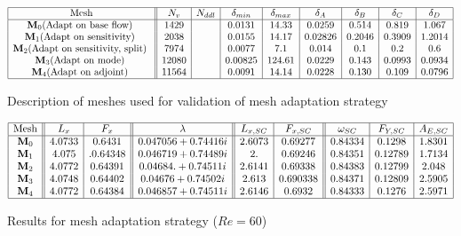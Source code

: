 \documentclass[twocolumn,10pt]{asme2ej}
\begin{document}

\begin{table*}
$$
\begin{array}{|c||c|c|c|c|c|c|c|c|c|}
\hline
\mbox{Mesh} & N_v & N_{ddl} & \delta_{min} & \delta_{max} & \delta_A  & \delta_B  & \delta_C  & \delta_D  \\
\hline
\mathbf{M}_0 \mbox{(Adapt on base flow) } & 1429 & 		& 0.0131 & 14.33 		& 0.0259 	& 0.514 	& 0.819 	& 1.067 \\   
\mathbf{M}_1 \mbox{(Adapt on sensitivity) } & 2038 & 		& 0.0155 & 14.17 		& 0.02826 & 0.2046 	& 0.3909 	& 1.2014 	\\
\mathbf{M}_2 \mbox{(Adapt on sensitivity, split) } & 7974 &		& 0.0077 & 7.1  		& 0.014 	& 0.1 	&   0.2 	& 0.6   \\
\mathbf{M}_3 \mbox{(Adapt on mode) } 	& 12080  &			&0.00825	& 124.61		& 0.0229	& 0.143	& 0.0993	& 0.0934 \\
\mathbf{M}_4 \mbox{(Adapt on adjoint) } 	& 11564 	&		& 0.0091	& 14.14		& 0.0228	& 0.130	& 0.109	& 0.0796  \\
\hline
\end{array}
$$
\caption{Description of meshes used for validation of mesh adaptation strategy}
\end{table*}


\begin{table*}
$$
\begin{array}{|c||c|c||c||c|c||c|c|c|}
\hline
\mbox{Mesh} & L_x & F_x & \lambda & L_{x,SC} & F_{x,SC} & \omega_{SC}  & F_{Y,SC} & A_{E,SC} \\
\hline
\mathbf{M}_0 & 4.0733 & 0.6431 	& 0.047056 + 0.74416i 		& 2.6073  &0.69277 		&  0.84334 & 0.1298 & 1.8301  \\
\mathbf{M}_1 & 4.075 &.  0.64348  	& 0.046719 + 0.74489i 		& 2.          & 0.69246 	& 0.84351 & 0.12789 & 1.7134 \\  
\mathbf{M}_2 & 4.0772 & 0.64391 	& 0.04684. +  0.74511i 		& 2.6141  & 0.69338 	& 0.84383 & 0.12799 & 2.048   \\ 
\mathbf{M}_3 & 4.0748 & 0.64402 	& 0.04676  + 0.74502i 		& 2.613 	& 0.690338 	& 0.84371 & 0.12809 & 2.5905 \\
\mathbf{M}_4 & 4.0772 & 0.64384	& 0.046857+0.74511i 		& 2.6146 	& 0.6932		& 0.84333 & 0.1276	 & 2.5971 \\
\hline
\end{array}
$$
\caption{Results for mesh adaptation strategy ($Re = 60$)}
\end{table*}
\end{document}
